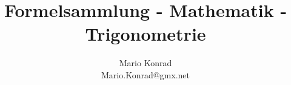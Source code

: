 \documentclass[10pt,a4paper,oneside]{article}
\begin{document}
\title{Formelsammlung - Mathematik - Trigonometrie}
\author{Mario Konrad\\Mario.Konrad@gmx.net}
\maketitle
\tableofcontents

\end{document}
